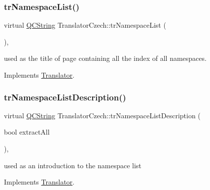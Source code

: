 \mbox{\label{class_translator_czech_acdcccfdbbd0cf73c47cea3989a3b0941}} 
\subsubsection{\texorpdfstring{trNamespaceList()}{trNamespaceList()}}
{\footnotesize\ttfamily virtual \mbox{\hyperlink{class_q_c_string}{Q\+C\+String}} Translator\+Czech\+::tr\+Namespace\+List (\begin{DoxyParamCaption}{ }\end{DoxyParamCaption})\hspace{0.3cm}{\ttfamily [inline]}, {\ttfamily [virtual]}}

used as the title of page containing all the index of all namespaces. 

Implements \mbox{\hyperlink{class_translator}{Translator}}.

\mbox{\label{class_translator_czech_a2d6f887ee56fb3cf823aea320c23a004}} 
\subsubsection{\texorpdfstring{trNamespaceListDescription()}{trNamespaceListDescription()}}
{\footnotesize\ttfamily virtual \mbox{\hyperlink{class_q_c_string}{Q\+C\+String}} Translator\+Czech\+::tr\+Namespace\+List\+Description (\begin{DoxyParamCaption}\item[{bool}]{extract\+All }\end{DoxyParamCaption})\hspace{0.3cm}{\ttfamily [inline]}, {\ttfamily [virtual]}}

used as an introduction to the namespace list 

Implements \mbox{\hyperlink{class_translator}{Translator}}.

\mbox{\label{class_translator_czech_a498d1a63aef8b403bbeac2563da82d11}} 
